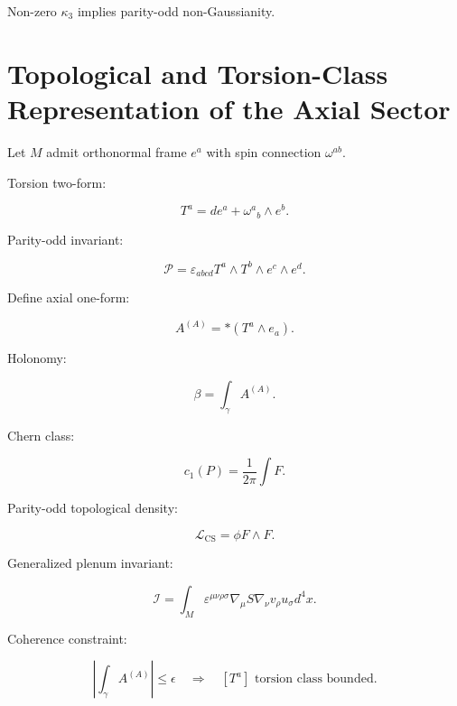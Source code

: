 \documentclass[12pt]{article}
\begin{document}
Non-zero $\kappa_3$ implies parity-odd non-Gaussianity.

\section{Topological and Torsion-Class Representation of the Axial Sector}

Let $M$ admit orthonormal frame $e^a$ with spin connection $\omega^{ab}$.

Torsion two-form:

\begin{equation}
T^a
=
de^a
+
\omega^a{}_b \wedge e^b.
\end{equation}

Parity-odd invariant:

\begin{equation}
\mathcal{P}
=
\varepsilon_{abcd}
T^a \wedge T^b \wedge e^c \wedge e^d.
\end{equation}

Define axial one-form:

\begin{equation}
A^{(A)}
=
\ast (T^a \wedge e_a).
\end{equation}

Holonomy:

\begin{equation}
\beta
=
\int_\gamma A^{(A)}.
\end{equation}

Chern class:

\begin{equation}
c_1(P)
=
\frac{1}{2\pi}
\int F.
\end{equation}

Parity-odd topological density:

\begin{equation}
\mathcal{L}_{\mathrm{CS}}
=
\phi
F \wedge F.
\end{equation}

Generalized plenum invariant:

\begin{equation}
\mathcal{I}
=
\int_M
\varepsilon^{\mu\nu\rho\sigma}
\nabla_\mu S
\nabla_\nu v_\rho
u_\sigma
d^4x.
\end{equation}

Coherence constraint:

\begin{equation}
\left|
\int_\gamma A^{(A)}
\right|
\le
\epsilon
\quad
\Longrightarrow
\quad
[T^a] \text{ torsion class bounded}.
\end{equation}
\end{document}
